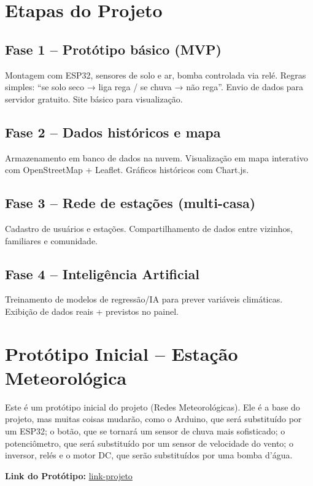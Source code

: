 \documentclass[
    12pt,
    openright,
    oneside,
    a4paper,
    brazil
]{abntex2}
\begin{document}
\section{Etapas do Projeto}

\subsection{Fase 1 – Protótipo básico (MVP)}  
Montagem com ESP32, sensores de solo e ar, bomba controlada via relé.  
Regras simples: “se solo seco → liga rega / se chuva → não rega”.  
Envio de dados para servidor gratuito.  
Site básico para visualização.  

\subsection{Fase 2 – Dados históricos e mapa}  
Armazenamento em banco de dados na nuvem.  
Visualização em mapa interativo com OpenStreetMap + Leaflet.  
Gráficos históricos com Chart.js.  

\subsection{Fase 3 – Rede de estações (multi-casa)}  
Cadastro de usuários e estações.  
Compartilhamento de dados entre vizinhos, familiares e comunidade.  

\subsection{Fase 4 – Inteligência Artificial}  
Treinamento de modelos de regressão/IA para prever variáveis climáticas.  
Exibição de dados reais + previstos no painel.  

\section{Protótipo Inicial – Estação Meteorológica}
Este é um protótipo inicial do projeto (Redes Meteorológicas). Ele é a base do 
projeto, mas muitas coisas mudarão, como o Arduino, que será substituído por um ESP32; o 
botão, que se tornará um sensor de chuva mais sofisticado; o potenciômetro, que será 
substituído por um sensor de velocidade do vento; o inversor, relés e o motor DC, que 
serão substituídos por uma bomba d’água.  

\vspace{0.5cm}

\textbf{Link do Protótipo:} 
\href{https://www.tinkercad.com/things/6btDA0XZOrf-estacao-meteorologica}{link-projeto}
\end{document}
